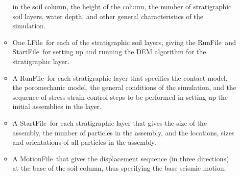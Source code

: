 \documentclass[letterpaper,11pt]{article}
\newcommand{\RunFile}{\textsf{RunFile}}
\newcommand{\StartFile}{\textsf{StartFile}}
\newcommand{\LFile}{\textsf{LFile}}
\newcommand{\MotionFile}{\textsf{MotionFile}}
\begin{document}
\begin{enumerate}
\begin{itemize}
          in the soil column, the height of the column,
          the number of stratigraphic soil layers,
          water depth, and
          other general characteristics of the simulation.
        \item
          One \LFile\ for each of the stratigraphic soil layers,
          giving the \RunFile\ and \StartFile\ for setting up and running
          the DEM algorithm for the stratigraphic layer.
        \item
          A \RunFile\ for each stratigraphic layer
          that specifies the contact model,
          the poromechanic model,
          the general conditions of the simulation,
          and the sequence of stress-strain control steps
          to be performed in setting up the initial assemblies
          in the layer.
        \item
          A \StartFile\ for each stratigraphic layer
          that gives the size of the assembly,
          the number of particles in the assembly,
          and the locations, sizes and orientations of
          all particles in the assembly.
        \item
          A \MotionFile\ that gives the displacement sequence
          (in three directions)
          at the base of the soil column,
          thus specifying the base seismic motion.
      \end{itemize}
\end{enumerate}
%
%
\end{document}
